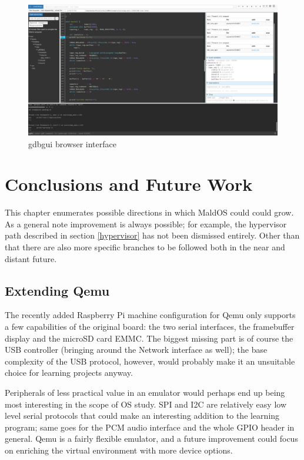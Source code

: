 \documentclass[12pt,a4paper,openright,twoside]{report}
\begin{document}
 \begin{figure}[t]
 \includegraphics[scale=0.34,angle=-90,origin=c]{images/tesi4.png}
 \caption[Gdbgui]{gdbgui browser interface}\label{fig:gdbgui}
 \end{figure}





\clearpage{\pagestyle{empty}\cleardoublepage}
\chapter{Conclusions and Future Work}
This chapter enumerates possible directions in which MaldOS could could grow. 
As a general note improvement is always possible; for example, the hypervisor path
described in section \ref{hypervisor} has not been dismissed entirely. Other than
that there are also more specific branches to be followed both in the near and
distant future.

\section{Extending Qemu}
The recently added Raspberry Pi machine configuration for Qemu only supports a few
capabilities of the original board: the two serial interfaces, the framebuffer
display and the microSD card EMMC.
The biggest missing part is of course the USB controller (bringing around the
Network interface as well); the base complexity of the USB protocol, however,
 would probably make it an unsuitable choice for learning projects anyway.

Peripherals of less practical value in an emulator would perhaps end up being
most interesting in the scope of OS study. SPI and I2C are relatively
easy low level serial protocols that could make an interesting addition to the
learning program; same goes for the PCM audio interface and the whole GPIO 
header in general.
Qemu is a fairly flexible emulator, and a future improvement could focus on 
enriching the virtual environment with more device options.
\end{document}
